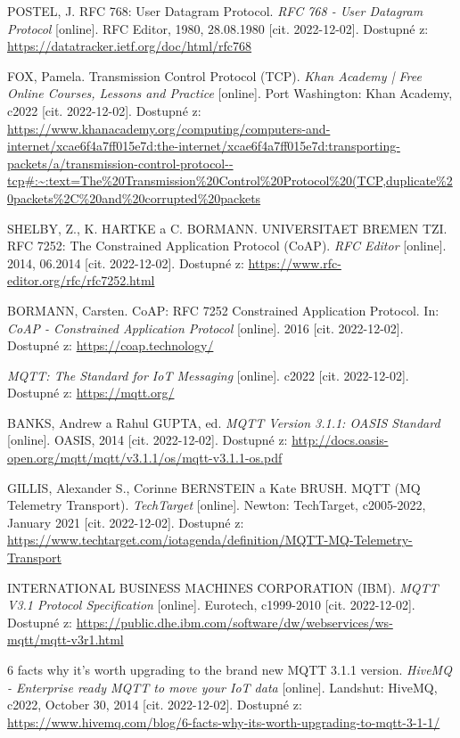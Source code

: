 \begin{thebibliography}{99}
POSTEL, J. RFC 768: User Datagram Protocol. \textit{RFC 768 - User Datagram Protocol} [online]. RFC Editor, 1980, 28.08.1980 [cit. 2022-12-02]. Dostupné z: \url{https://datatracker.ietf.org/doc/html/rfc768}

FOX, Pamela. Transmission Control Protocol (TCP). \textit{Khan Academy | Free Online Courses, Lessons and Practice} [online]. Port Washington: Khan Academy, c2022 [cit. 2022-12-02]. Dostupné z: \url{https://www.khanacademy.org/computing/computers-and-internet/xcae6f4a7ff015e7d:the-internet/xcae6f4a7ff015e7d:transporting-packets/a/transmission-control-protocol--tcp\#:~:text=The\%20Transmission\%20Control\%20Protocol\%20(TCP,duplicate\%20packets\%2C\%20and\%20corrupted\%20packets}

SHELBY, Z., K. HARTKE a C. BORMANN. UNIVERSITAET BREMEN TZI. RFC 7252: The Constrained Application Protocol (CoAP). \textit{RFC Editor} [online]. 2014, 06.2014 [cit. 2022-12-02]. Dostupné z: \url{https://www.rfc-editor.org/rfc/rfc7252.html}

BORMANN, Carsten. CoAP: RFC 7252 Constrained Application Protocol. In: \textit{CoAP - Constrained Application Protocol} [online]. 2016 [cit. 2022-12-02]. Dostupné z: \url{https://coap.technology/}

\textit{MQTT: The Standard for IoT Messaging} [online]. c2022 [cit. 2022-12-02]. Dostupné z: \url{https://mqtt.org/}

BANKS, Andrew a Rahul GUPTA, ed. \textit{MQTT Version 3.1.1: OASIS Standard} [online]. OASIS, 2014 [cit. 2022-12-02]. Dostupné z: \url{http://docs.oasis-open.org/mqtt/mqtt/v3.1.1/os/mqtt-v3.1.1-os.pdf}

GILLIS, Alexander S., Corinne BERNSTEIN a Kate BRUSH. MQTT (MQ Telemetry Transport). \textit{TechTarget} [online]. Newton: TechTarget, c2005-2022, January 2021 [cit. 2022-12-02]. Dostupné z: \url{https://www.techtarget.com/iotagenda/definition/MQTT-MQ-Telemetry-Transport}

INTERNATIONAL BUSINESS MACHINES CORPORATION (IBM). \textit{MQTT V3.1 Protocol Specification} [online]. Eurotech, c1999-2010 [cit. 2022-12-02]. Dostupné z: \url{https://public.dhe.ibm.com/software/dw/webservices/ws-mqtt/mqtt-v3r1.html}

6 facts why it's worth upgrading to the brand new MQTT 3.1.1 version. \textit{HiveMQ - Enterprise ready MQTT to move your IoT data} [online]. Landshut: HiveMQ, c2022, October 30, 2014 [cit. 2022-12-02]. Dostupné z: \url{https://www.hivemq.com/blog/6-facts-why-its-worth-upgrading-to-mqtt-3-1-1/}


\end{thebibliography}

